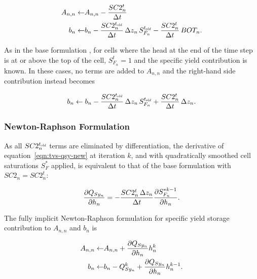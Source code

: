 \begin{equation}
	\label{eqn:tvs-sy-Ab-std}
	\begin{aligned}
		A_{n,n} \leftarrow & A_{n,n} - \frac{SC2_n^t}{\Delta t} \\
		b_n \leftarrow & b_n - \frac{SC2_n^{t_\mathit{\kern -0.07em old}}}{\Delta t} \, \Delta z_n \, S_{F_n}^{t_\mathit{\kern -0.07em old}} - \frac{SC2_n^t}{\Delta t} \, BOT_n .
	\end{aligned}
\end{equation}

\noindent As in the base formulation \citep[Chapter 5]{modflow6gwf}, for cells where the head at the end of the time step is at or above the top of the cell, $S_{F_n}^t = 1$ and the specific yield contribution is known. In these cases, no terms are added to $A_{n,n}$ and the right-hand side contribution instead becomes

\begin{equation}
	\label{eqn:tvs-sy-b-fullsat}
	b_n \leftarrow b_n - \frac{SC2_n^{t_\mathit{\kern -0.07em old}}}{\Delta t} \, \Delta z_n \, S_{F_n}^{t_\mathit{\kern -0.07em old}} + \frac{SC2_n^t}{\Delta t} \, \Delta z_n .
\end{equation}


\subsubsection{Newton-Raphson Formulation}

As all $SC2_n^{t_\mathit{\kern -0.07em old}}$ terms are eliminated by differentiation, the derivative of equation~\ref{eqn:tvs-qsy-new} at iteration $k$, and with quadratically smoothed cell saturations $S_F^*$ applied, is equivalent to that of the base formulation \citep[eq. 5--14]{modflow6gwf} with $SC2_n = SC2_n^t$:

\begin{equation}
	\label{eqn:tvs-qsy-nr-deriv}
	\frac{\partial Q_{Sy_n}}{\partial h_n} = - \frac{SC2_n^t \, \Delta z_n}{\Delta t} \frac{\partial S_{F_n}^{\ast k-1}}{\partial h_n} .
\end{equation}

\noindent The fully implicit Newton-Raphson formulation for specific yield storage contribution to $A_{n,n}$ and $b_n$ is

\begin{equation}
	\label{eqn:tvs-sy-nr}
	\begin{aligned}
		A_{n,n} \leftarrow & A_{n,n} + \frac{\partial Q_{Sy_n}}{\partial h_n} h_n^k \\
		b_n \leftarrow & b_n - Q_{Sy_n}^k + \frac{\partial Q_{Sy_n}}{\partial h_n} h_n^{k-1} .
	\end{aligned}
\end{equation}

